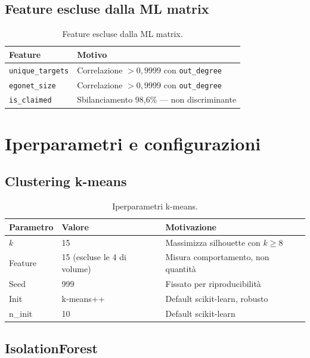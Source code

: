 \documentclass[12pt,a4paper]{report}
\newcommand{\code}[1]{\texttt{#1}}
\begin{document}
\section{Feature escluse dalla ML matrix}

\begin{table}[H]
\centering
\caption{Feature escluse dalla ML matrix.}
\begin{tabular}{@{}lp{8cm}@{}}
\toprule
Feature & Motivo \\
\midrule
\code{unique\_targets} & Correlazione $> 0{,}9999$ con \code{out\_degree} \\
\code{egonet\_size} & Correlazione $> 0{,}9999$ con \code{out\_degree} \\
\code{is\_claimed} & Sbilanciamento 98,6\% --- non discriminante \\
\bottomrule
\end{tabular}
\end{table}

\chapter{Iperparametri e configurazioni}

\section{Clustering k-means}

\begin{table}[H]
\centering
\caption{Iperparametri k-means.}
\begin{tabular}{@{}lp{4cm}p{5cm}@{}}
\toprule
Parametro & Valore & Motivazione \\
\midrule
$k$ & 15 & Massimizza silhouette con $k \geq 8$ \\
Feature & 15 (escluse le 4 di volume) & Misura comportamento, non quantità \\
Seed & 999 & Fissato per riproducibilità \\
Init & k-means++ & Default scikit-learn, robusto \\
n\_init & 10 & Default scikit-learn \\
\bottomrule
\end{tabular}
\end{table}

\section{IsolationForest}
\end{document}
